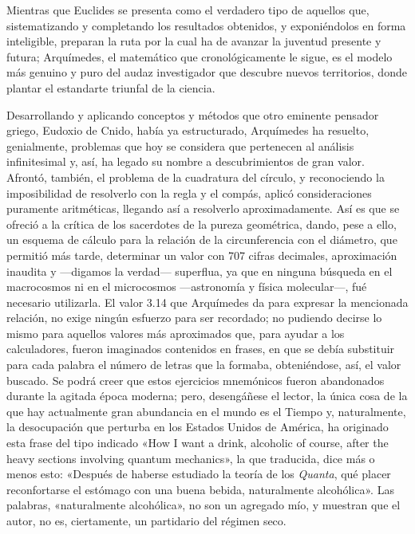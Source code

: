\documentclass[a4paper, 12pt, draft]{article}
\begin{document}
{Mientras que Euclides se presenta como el verdadero tipo de aquellos que, sistematizando y completando los resultados obtenidos, y exponiéndolos en forma inteligible, preparan la ruta por la cual ha de avanzar la juventud presente y futura; Arquímedes, el matemático que cronológicamente le sigue, es el modelo más genuino y puro del audaz investigador que descubre nuevos territorios, donde plantar el estandarte triunfal de la ciencia.

Desarrollando y aplicando conceptos y métodos que otro eminente pensador griego, Eudoxio de Cnido, había ya estructurado, Arquímedes ha resuelto, genialmente, problemas que hoy se considera que pertenecen al análisis infinitesimal y, así, ha legado su nombre a descubrimientos de gran valor. Afrontó, también, el problema de la cuadratura del círculo, y reconociendo la imposibilidad de resolverlo con la regla y el compás, aplicó consideraciones puramente aritméticas, llegando así a resolverlo aproximadamente. Así es que se ofreció a la crítica de los sacerdotes de la pureza geométrica, dando, pese a ello, un esquema de cálculo para la relación de la circunferencia con el diámetro, que permitió más tarde, determinar un valor con 707 cifras decimales, aproximación inaudita y ---digamos la verdad--- superflua, ya que en ninguna búsqueda en el macrocosmos ni en el microcosmos ---astronomía y física molecular---, fué necesario utilizarla. El valor 3.14 que Arquímedes da para expresar la mencionada relación, no exige ningún esfuerzo para ser recordado; no pudiendo decirse lo mismo para aquellos valores más aproximados que, para ayudar a los calculadores, fueron imaginados contenidos en frases, en que se debía substituir para cada palabra el número de letras que la formaba, obteniéndose, así, el valor buscado. Se podrá creer que estos ejercicios mnemónicos fueron abandonados durante la agitada época moderna; pero, desengáñese el lector, la única cosa de la que hay actualmente gran abundancia en el mundo es el Tiempo y, naturalmente, la desocupación que perturba en los Estados Unidos de América, ha originado esta frase del tipo indicado «How I want a drink, alcoholic of course, after the heavy sections involving quantum mechanics», la que traducida, dice más o menos esto: «Después de haberse estudiado la teoría de los \textit{ Quanta}, qué placer reconfortarse el estómago con una buena bebida, naturalmente alcohólica». Las palabras, «naturalmente alcohólica», no son un agregado mío, y muestran que el autor, no es, ciertamente, un partidario del régimen seco.


}
\end{document}
